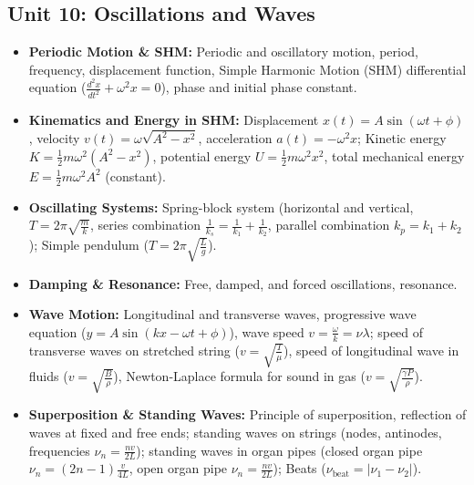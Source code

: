 \documentclass[11pt,a4paper]{article}
\begin{document}
\subsection{Unit 10: Oscillations and Waves}
\begin{itemize}
  \item \textbf{Periodic Motion \& SHM:} Periodic and oscillatory motion, period, frequency, displacement function, Simple Harmonic Motion (SHM) differential equation ($\frac{d^2 x}{dt^2} + \omega^2 x = 0$), phase and initial phase constant.
  \item \textbf{Kinematics and Energy in SHM:} Displacement $x(t) = A\sin(\omega t + \phi)$, velocity $v(t) = \omega\sqrt{A^2-x^2}$, acceleration $a(t) = -\omega^2 x$; Kinetic energy $K = \frac{1}{2}m\omega^2(A^2-x^2)$, potential energy $U = \frac{1}{2}m\omega^2 x^2$, total mechanical energy $E = \frac{1}{2}m\omega^2 A^2$ (constant).
  \item \textbf{Oscillating Systems:} Spring-block system (horizontal and vertical, $T = 2\pi\sqrt{\frac{m}{k}}$, series combination $\frac{1}{k_s} = \frac{1}{k_1} + \frac{1}{k_2}$, parallel combination $k_p = k_1 + k_2$); Simple pendulum ($T = 2\pi\sqrt{\frac{L}{g}}$).
  \item \textbf{Damping \& Resonance:} Free, damped, and forced oscillations, resonance.
  \item \textbf{Wave Motion:} Longitudinal and transverse waves, progressive wave equation ($y = A\sin(kx - \omega t + \phi)$), wave speed $v = \frac{\omega}{k} = \nu\lambda$; speed of transverse waves on stretched string ($v = \sqrt{\frac{T}{\mu}}$), speed of longitudinal wave in fluids ($v = \sqrt{\frac{B}{\rho}}$), Newton-Laplace formula for sound in gas ($v = \sqrt{\frac{\gamma P}{\rho}}$).
  \item \textbf{Superposition \& Standing Waves:} Principle of superposition, reflection of waves at fixed and free ends; standing waves on strings (nodes, antinodes, frequencies $\nu_n = \frac{nv}{2L}$); standing waves in organ pipes (closed organ pipe $\nu_n = (2n-1)\frac{v}{4L}$, open organ pipe $\nu_n = \frac{nv}{2L}$); Beats ($\nu_{\text{beat}} = |\nu_1 - \nu_2|$).
\end{itemize}
\end{document}

